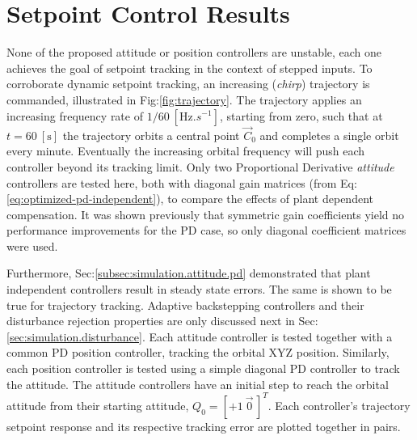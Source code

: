 \section{Setpoint Control Results}
\label{sec:simulation.autopilot}
None of the proposed attitude or position controllers are unstable, each one achieves the goal of setpoint tracking in the context of stepped inputs. To corroborate dynamic setpoint tracking, an increasing (\emph{chirp}) trajectory is commanded, illustrated in Fig:\ref{fig:trajectory}. The trajectory applies an increasing frequency rate of $1/60~[\text{Hz}.s^{-1}]$, starting from zero, such that at $t=60~[\text{s}]$ the trajectory orbits a central point $\vec{C}_0$ and completes a single orbit every minute. Eventually the increasing orbital frequency will push each controller beyond its tracking limit. Only two Proportional Derivative \emph{attitude} controllers are tested here, both with diagonal gain matrices (from Eq:\ref{eq:optimized-pd-independent}), to compare the effects of plant dependent compensation. It was shown previously that symmetric gain coefficients yield no performance improvements for the PD case, so only diagonal coefficient matrices were used. 
\par
Furthermore, Sec:\ref{subsec:simulation.attitude.pd} demonstrated that plant independent controllers result in steady state errors. The same is shown to be true for trajectory tracking. Adaptive backstepping controllers and their disturbance rejection properties are only discussed next in Sec:\ref{sec:simulation.disturbance}. Each attitude controller is tested together with a common PD position controller, tracking the orbital XYZ position. Similarly, each position controller is tested using a simple diagonal PD controller to track the attitude. The attitude controllers have an initial step to reach the orbital attitude from their starting attitude, $Q_0=[+1~\vec{0}\hspace{2pt}]^T$. Each controller's trajectory setpoint response and its respective tracking error are plotted together in pairs.
